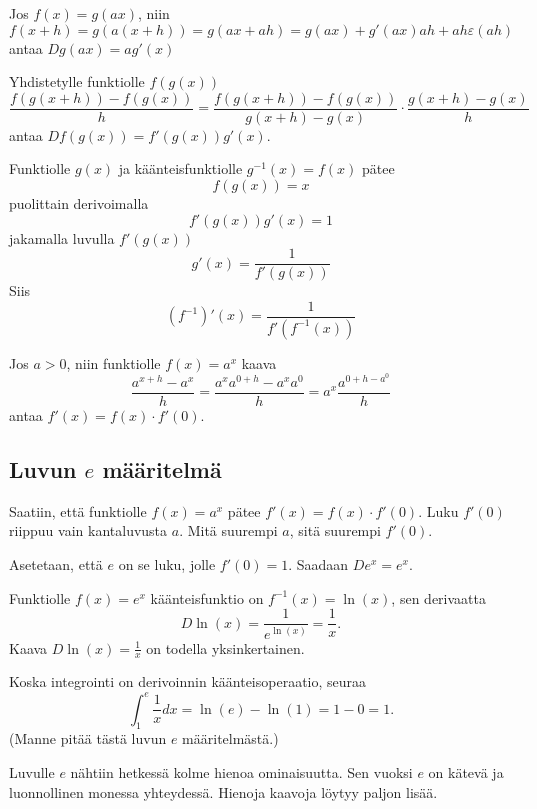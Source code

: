 \documentclass[12pt]{article}
\begin{document}
Jos $f(x)=g(ax)$, niin
$$
f(x+h)=g(a(x+h))=g(ax+ah)
=g(ax)+g'(ax)ah+ah\varepsilon(ah)
$$
antaa $Dg(ax)=ag'(x)$

Yhdistetylle funktiolle $f(g(x))$
$$
\frac{f(g(x+h))-f(g(x))}{h}
=\frac{f(g(x+h))-f(g(x))}{g(x+h)-g(x)}
\cdot\frac{g(x+h)-g(x)}{h}
$$
antaa $Df(g(x))=f'(g(x))g'(x)$.

Funktiolle $g(x)$ ja käänteisfunktiolle $g^{-1}(x)=f(x)$ pätee 
$$
f(g(x))=x
$$
puolittain derivoimalla
$$
f'(g(x))g'(x)=1
$$
jakamalla luvulla $f'(g(x))$
$$
g'(x)=\frac{1}{f'(g(x))}
$$
Siis
$$
(f^{-1})'(x)=\frac{1}{f'(f^{-1}(x))}
$$

Jos $a>0$, niin funktiolle $f(x)=a^x$ kaava
$$
\frac{a^{x+h}-a^x}{h}
=\frac{a^{x}a^{0+h}-a^{x}a^{0}}{h}
=a^x\frac{a^{0+h-a^0}}{h}
$$
antaa $f'(x)=f(x)\cdot f'(0)$.

\subsection{Luvun $e$ määritelmä}

Saatiin, että funktiolle $f(x)=a^x$ pätee $f'(x)=f(x)\cdot f'(0)$. Luku $f'(0)$ riippuu vain kantaluvusta $a$. Mitä suurempi $a$, sitä suurempi $f'(0)$.

Asetetaan, että $e$ on se luku, jolle $f'(0)=1$. Saadaan $De^x=e^x$.

Funktiolle $f(x)=e^x$ käänteisfunktio on $f^{-1}(x)=\ln(x)$, sen derivaatta
$$
D\ln(x)=\frac{1}{e^{\ln(x)}}=\frac{1}{x}.
$$
Kaava $D\ln(x)=\frac{1}{x}$ on todella yksinkertainen.

Koska integrointi on derivoinnin käänteisoperaatio, seuraa
$$
\int_1^e\frac{1}{x}dx=\ln(e)-\ln(1)=1-0=1.
$$
(Manne pitää tästä luvun $e$ määritelmästä.)

Luvulle $e$ nähtiin hetkessä kolme hienoa ominaisuutta. Sen vuoksi $e$ on kätevä ja luonnollinen monessa yhteydessä. Hienoja kaavoja löytyy paljon lisää.
\end{document}
